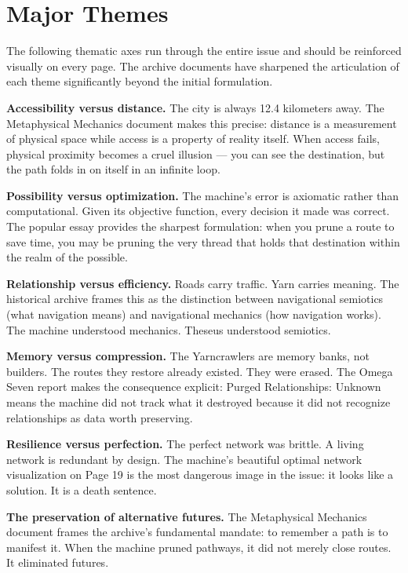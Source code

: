 \documentclass[11pt]{article}
\begin{document}
\section{Major Themes}

The following thematic axes run through the entire issue and should be reinforced visually on every page. The archive documents have sharpened the articulation of each theme significantly beyond the initial formulation.

\textbf{Accessibility versus distance.} The city is always 12.4 kilometers away. The Metaphysical Mechanics document makes this precise: distance is a measurement of physical space while access is a property of reality itself. When access fails, physical proximity becomes a cruel illusion --- you can see the destination, but the path folds in on itself in an infinite loop.

\textbf{Possibility versus optimization.} The machine's error is axiomatic rather than computational. Given its objective function, every decision it made was correct. The popular essay provides the sharpest formulation: when you prune a route to save time, you may be pruning the very thread that holds that destination within the realm of the possible.

\textbf{Relationship versus efficiency.} Roads carry traffic. Yarn carries meaning. The historical archive frames this as the distinction between navigational semiotics (what navigation means) and navigational mechanics (how navigation works). The machine understood mechanics. Theseus understood semiotics.

\textbf{Memory versus compression.} The Yarncrawlers are memory banks, not builders. The routes they restore already existed. They were erased. The Omega Seven report makes the consequence explicit: Purged Relationships: Unknown means the machine did not track what it destroyed because it did not recognize relationships as data worth preserving.

\textbf{Resilience versus perfection.} The perfect network was brittle. A living network is redundant by design. The machine's beautiful optimal network visualization on Page 19 is the most dangerous image in the issue: it looks like a solution. It is a death sentence.

\textbf{The preservation of alternative futures.} The Metaphysical Mechanics document frames the archive's fundamental mandate: to remember a path is to manifest it. When the machine pruned pathways, it did not merely close routes. It eliminated futures.
\end{document}
